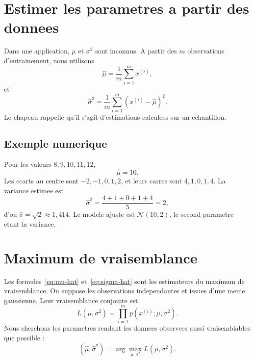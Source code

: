 \section{Estimer les parametres a partir des donnees}

Dans une application, $\mu$ et $\sigma^2$ sont inconnus. A partir des $m$
observations d'entrainement, nous utilisons
\begin{equation}
\widehat\mu=\frac{1}{m}\sum_{i=1}^{m}x^{(i)},
\label{eq:mu-hat}
\end{equation}
et
\begin{equation}
\widehat\sigma^2=
\frac{1}{m}\sum_{i=1}^{m}\left(x^{(i)}-\widehat\mu\right)^2.
\label{eq:sigma-hat}
\end{equation}
Le chapeau rappelle qu'il s'agit d'estimations calculees sur un echantillon.

\subsection{Exemple numerique}

Pour les valeurs $8,9,10,11,12$,
\begin{equation}
\widehat\mu=10.
\end{equation}
Les ecarts au centre sont $-2,-1,0,1,2$, et leurs carres sont $4,1,0,1,4$.
La variance estimee est
\begin{equation}
\widehat\sigma^2=\frac{4+1+0+1+4}{5}=2,
\end{equation}
d'ou $\widehat\sigma=\sqrt{2}\approx1{,}414$. Le modele ajuste est
$\mathcal N(10,2)$, le second parametre etant la variance.

\section{Maximum de vraisemblance}

Les formules~\eqref{eq:mu-hat} et~\eqref{eq:sigma-hat} sont les estimateurs du
maximum de vraisemblance. On suppose les observations independantes et issues
d'une meme gaussienne. Leur vraisemblance conjointe est
\begin{equation}
L(\mu,\sigma^2)=\prod_{i=1}^{m}p(x^{(i)};\mu,\sigma^2).
\end{equation}
Nous cherchons les parametres rendant les donnees observees aussi vraisemblables
que possible :
\begin{equation}
(\widehat\mu,\widehat\sigma^2)=
\arg\max_{\mu,\sigma^2}L(\mu,\sigma^2).
\end{equation}

